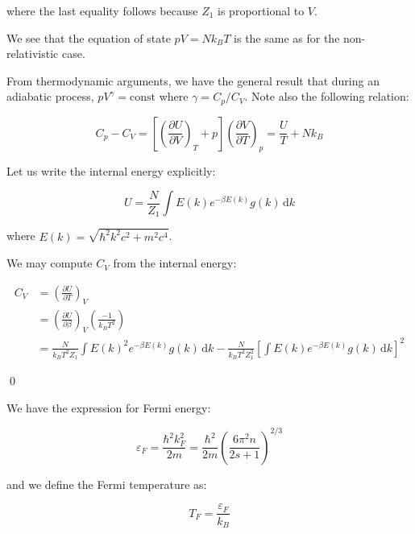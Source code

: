 \documentclass[12pt]{article}
\begin{document}
where the last equality follows because $Z_{1}$ is proportional to $V$.

We see that the equation of state $pV = Nk_{B}T$ is the same as for the non-relativistic case.

From thermodynamic arguments, we have the general result that during an adiabatic process, $pV^{\gamma} = \text{const}$ where $\gamma = C_{p}/C_{V}$. Note also the following relation:

\begin{equation}
    C_{p} - C_{V} = \left[ \left( \frac{\partial U}{\partial V} \right)_{T} + p \right] \left( \frac{\partial V}{\partial T} \right)_{p} = \frac{U}{T} + Nk_{B}
\end{equation}

Let us write the internal energy explicitly:

\begin{equation}
    U = \frac{N}{Z_{1}} \int E(k) e^{-\beta E(k)} g(k) \, \mathrm{d}k
\end{equation}

where $E(k) = \sqrt{\hbar^{2} k^{2} c^{2} + m^{2} c^{4}}$.

We may compute $C_{V}$ from the internal energy:

\begin{equation}
    \begin{split}
        C_{V} &= \left( \frac{\partial U}{\partial T} \right)_{V} \\
        &= \left( \frac{\partial U}{\partial \beta} \right)_{V} \left( \frac{-1}{k_{B}T^{2}} \right) \\
        &= \frac{N}{k_{B} T^{2} Z_{1}} \int E(k)^{2} e^{-\beta E(k)} g(k) \, \mathrm{d}k - \frac{N}{k_{B} T^{2} Z_{1}^{2}} \left[ \int E(k) e^{-\beta E(k)} g(k) \, \mathrm{d}k \right]^{2}
    \end{split}
\end{equation}

\qed


We have the expression for Fermi energy:

\begin{equation}
    \varepsilon_{F} = \frac{\hbar^{2} k_{F}^{2}}{2m} = \frac{\hbar^{2}}{2m} \left( \frac{6\pi^{2} n}{2s + 1} \right)^{2/3}
\end{equation}

and we define the Fermi temperature as:

\begin{equation}
    T_{F} = \frac{\varepsilon_{F}}{k_{B}}
\end{equation}
\end{document}
